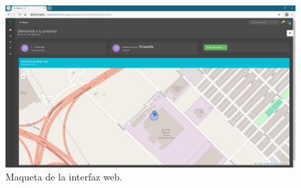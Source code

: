 \begin{figure}[htbp]
	\centering
	\includegraphics[width=1\textwidth]{./Figures/web_final.jpeg}
	\caption{Maqueta de la interfaz web.}
	\label{fig:web_final}
\end{figure}












